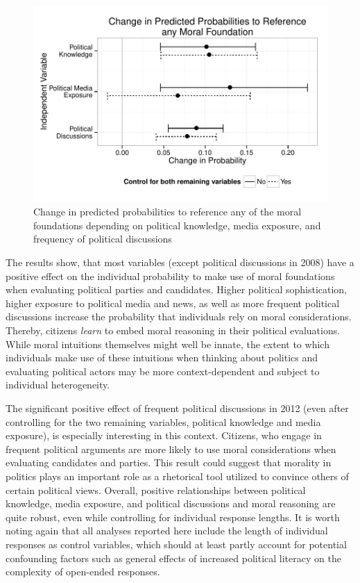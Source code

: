 \documentclass[12pt]{article}
\begin{document}
\begin{figure}\centering
\includegraphics{../calc/fig/fig3learn.pdf}
\caption{Change in predicted probabilities to reference any of the moral foundations depending on political knowledge, media exposure, and frequency of political discussions}\label{fig:3learn}
\end{figure}

The results show, that most variables (except political discussions in 2008) have a positive effect on the individual probability to make use of moral foundations when evaluating political parties and candidates. Higher political sophistication, higher exposure to political media and news, as well as more frequent political discussions increase the probability that individuals rely on moral considerations. Thereby, citizens \textit{learn} to embed moral reasoning in their political evaluations. While moral intuitions themselves might well be innate, the extent to which individuals make use of these intuitions when thinking about politics and evaluating political actors may be more context-dependent and subject to individual heterogeneity.

The significant positive effect of frequent political discussions in 2012 (even after controlling for the two remaining variables, political knowledge and media exposure), is especially interesting in this context. Citizens, who engage in frequent political arguments are more likely to use moral considerations when evaluating candidates and parties. This result could suggest that morality in politics plays an important role as a rhetorical tool utilized to convince others of certain political views. Overall, positive relationships between political knowledge, media exposure, and political discussions and moral reasoning are quite robust, even while controlling for individual response lengths. It is worth noting again that all analyses reported here include the length of individual responses as control variables, which should at least partly account for potential confounding factors such as general effects of increased political literacy on the complexity of open-ended responses.
\end{document}

